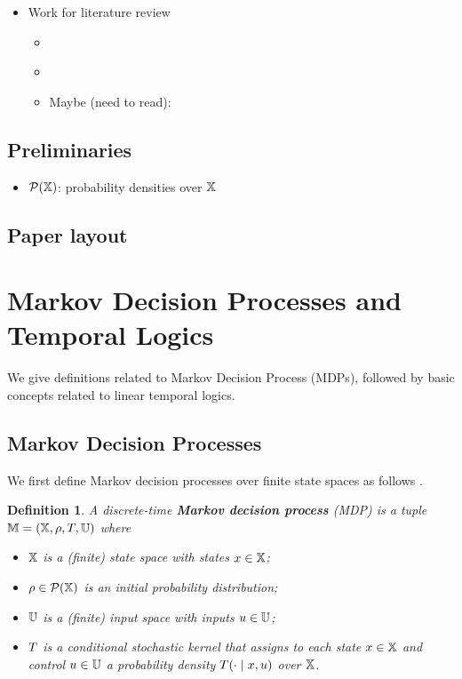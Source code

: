 \documentclass[conference]{IEEEtran}
\newtheorem{definition}{Definition}
\begin{document}
\begin{itemize}
  \item Work for literature review
  \begin{itemize}
    \item \cite{Papusha2016}
    \item \cite{Alora2016}
    \item Maybe (need to read): \cite{Lavaei2017}
  \end{itemize}
\end{itemize}

\subsection{Preliminaries}

\begin{itemize}
  \item $\mathcal P(\mathbb{X})$: probability densities over $\mathbb{X}$
\end{itemize}

\subsection{Paper layout}

\section{Markov Decision Processes and Temporal Logics}

We give definitions related to Markov Decision Process (MDPs), followed by basic concepts related to linear temporal logics.

\subsection{Markov Decision Processes}

We first define Markov decision processes over finite state spaces as follows \cite{hll1996}.
\begin{definition}
\label{def:MDP}
  A discrete-time \textbf{Markov decision process} (MDP) is a tuple $\mathbb{M} = (\mathbb{X}, \rho, T, \mathbb{U})$ where
  \begin{itemize}
    \item $\mathbb{X}$ is a (finite) state space with states $x\in\mathbb{X}$; %
    \item $\rho \in \mathcal P(\mathbb{X})$ is an initial probability distribution;
    \item $\mathbb{U}$ is a (finite) input space with inputs $u\in\mathbb{U}$;
    \item $T$ is a conditional stochastic kernel that assigns to each state $x\in \mathbb{X}$ and control $u\in \mathbb{U}$ a probability density $T(\cdot\mid x,u)$ over $\mathbb{X}$.
  \end{itemize}
\end{definition}
\end{document}

